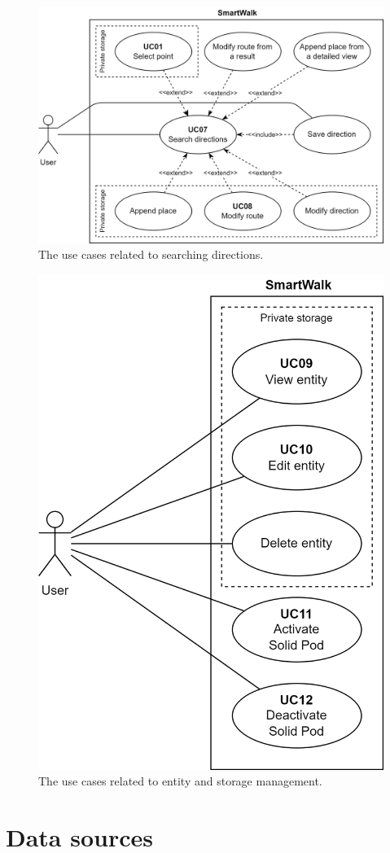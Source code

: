 \begin{figure}
\centering
\includegraphics[width=0.95\linewidth]{img/analysis/uc-search-direcs.png}
\caption{The use cases related to searching directions.}
\label{fig:uc-search-direcs}
\end{figure}

\begin{figure}
\centering
\includegraphics[width=0.55\linewidth]{img/analysis/uc-entity-and-storage-management.png}
\caption{The use cases related to entity and storage management.}
\label{fig:uc-entity-and-storage-management}
\end{figure}

\clearpage

\section{Data sources}\label{sec:data-sources}

